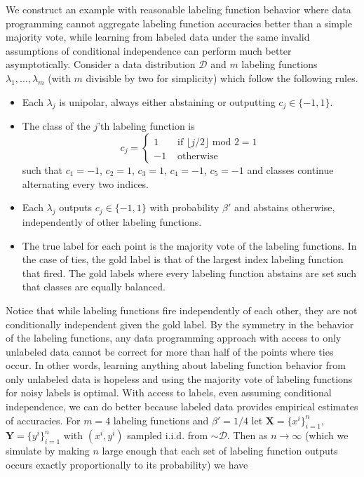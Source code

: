 We construct an example with reasonable labeling function behavior where data programming cannot aggregate labeling function accuracies better than a simple majority vote, while learning from labeled data under the same invalid assumptions of conditional independence can perform much better asymptotically. Consider a data distribution $\mathcal{D}$ and $m$ labeling functions $\lambda_1,\hdots,\lambda_m$ (with $m$ divisible by two for simplicity) which follow the following rules.
\begin{itemize}
    \item Each $\lambda_j$ is unipolar, always either abstaining or outputting $c_j\in\{-1,1\}$.
    
    \item The class of the $j$'th labeling function is
    \[c_j=\begin{cases}
        1&\text{ if }\lfloor j/2\rfloor\text{ mod }2=1\\
        -1&\text{ otherwise}
    \end{cases}\]
    such that $c_1=-1$, $c_2=1$, $c_3=1$, $c_4=-1$, $c_5=-1$ and classes continue alternating every two indices.
    
    \item Each $\lambda_j$ outputs $c_j\in\{-1,1\}$ with probability $\beta'$ and abstains otherwise, independently of other labeling functions.
    
    \item The true label for each point is the majority vote of the labeling functions. In the case of ties, the gold label is that of the largest index labeling function that fired. The gold labels where every labeling function abstains are set such that classes are equally balanced.
\end{itemize}
Notice that while labeling functions fire independently of each other, they are not conditionally independent given the gold label. By the symmetry in the behavior of the labeling functions, any data programming approach with access to only unlabeled data cannot be correct for more than half of the points where ties occur. In other words, learning anything about labeling function behavior from only unlabeled data is hopeless and using the majority vote of labeling functions for noisy labels is optimal. With access to labels, even assuming conditional independence, we can do better because labeled data provides empirical estimates of accuracies. For $m=4$ labeling functions and $\beta'=1/4$ let $\boldsymbol{X}=\{x^i\}_{i=1}^n$, $\boldsymbol{Y}=\{y^i\}_{i=1}^n$ with $(x^i,y^i)$ sampled i.i.d. from $\sim\mathcal{D}$. Then as $n\to\infty$ (which we simulate by making $n$ large enough that each set of labeling function outputs occurs exactly proportionally to its probability) we have
